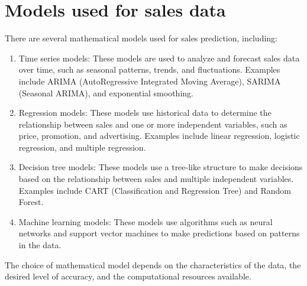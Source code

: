 \section{Models used for sales data} \label{sec:models}
There are several mathematical models used for sales prediction, including:
\\
\begin{enumerate}
    \item Time series models: These models are used to analyze and forecast sales data over time, such as seasonal
    patterns, trends, and fluctuations. Examples include ARIMA (AutoRegressive Integrated Moving Average),
    SARIMA (Seasonal ARIMA), and exponential smoothing.
    \item Regression models: These models use historical data to determine the relationship between sales and
    one or more independent variables, such as price, promotion, and advertising. Examples include linear regression,
    logistic regression, and multiple regression.
    \item Decision tree models: These models use a tree-like structure to make decisions based on the relationship between
    sales and multiple independent variables. Examples include CART (Classification and Regression Tree) and Random Forest.
    \item Machine learning models: These models use algorithms such as neural networks and support vector
    machines to make predictions based on patterns in the data.
\end{enumerate}
The choice of mathematical model depends on the characteristics of the data, the desired level of accuracy, and the
computational resources available.
\\

